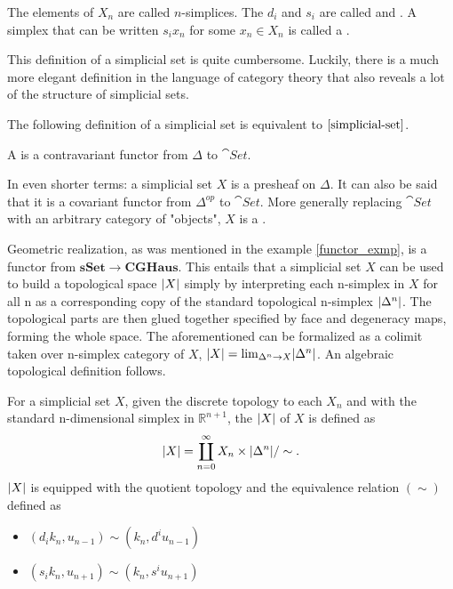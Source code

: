 \documentclass[../../main.tex]{subfiles}
\begin{document}
    The elements of $X_n$ are called $n$-simplices. The $d_i$ and $s_i$ are called  and . A simplex that can be written $s_ix_n$ for some $x_n \in X_n$ is called a .
    
    This definition of a simplicial set is quite cumbersome. Luckily, there is a much more elegant definition in the language of category theory that also reveals a lot of the structure of simplicial sets.

    The following definition of a simplicial set is equivalent to $\ref{simplicial-set}$.

    \begin{definition}
        A  is a contravariant functor from $\Delta$ to $\cat{Set}$.
    \end{definition}

    In even shorter terms: a simplicial set $X$ is a presheaf on $\Delta$. It can also be said that it is a covariant functor from $\Delta^{op}$ to $\cat{Set}$. More generally replacing $\cat{Set}$ with an arbitrary category of "objects", $X$ is a .
    
    Geometric realization, as was mentioned in the example \ref{functor_exmp}, is a functor from $\mathbf{sSet}\to \mathbf{CGHaus}$. This entails that a simplicial set $X$ can be used to build a topological space $\geom[X]$ simply by interpreting each n-simplex in $X$ for all n as a corresponding copy of the standard topological n-simplex $\geom[\Delta^n]$. The topological parts are then glued together specified by face and degeneracy maps, forming the whole space. The aforementioned can be formalized as a colimit taken over n-simplex category of $X$, $\geom[X]= \lim_{\Delta^n\to X}\geom[\Delta^n]$. An algebraic topological definition follows.

    \begin{definition}
        For a simplicial set $X$, given the discrete topology to each $X_n$ and with the standard n-dimensional simplex in $\mathbb{R}^{n+1}$, the  $\geom[X]$ of $X$ is defined as
        \[\geom[X]=\coprod_{n=0}^{\infty} X_n \times \geom[\Delta^n]/\sim.\]
        $\geom[X]$ is equipped with the quotient topology and the equivalence relation $(\sim)$ defined as 
        \begin{itemize}
            \item $(d_ik_{n},u_{n-1})\sim(k_{n}, d^iu_{n-1})$
            \item $(s_ik_n, u_{n+1})\sim(k_n, s^iu_{n+1})$
        \end{itemize}
    \end{definition}
    
\end{document}
